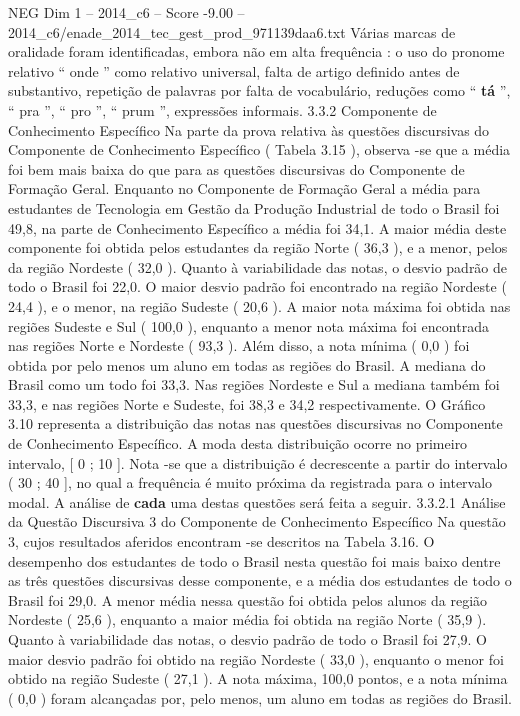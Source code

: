 \begin{textsample}{NEG Dim 1 – 2014\_c6 – Score -9.00 – 2014\_c6/enade\_2014\_tec\_gest\_prod\_971139daa6.txt}
Várias marcas de oralidade foram identificadas, embora não em alta frequência : o uso do pronome relativo “ onde ” como relativo universal, falta de artigo definido antes de substantivo, repetição de palavras por falta de vocabulário, reduções como “ \textbf{tá} ”, “ pra ”, “ pro ”, “ prum ”, expressões informais. 3.3.2 Componente de Conhecimento Específico Na parte da prova relativa às questões discursivas do Componente de Conhecimento Específico ( Tabela 3.15 ), observa -se que a média foi bem mais baixa do que para as questões discursivas do Componente de Formação Geral.
Enquanto no Componente de Formação Geral a média para estudantes de Tecnologia em Gestão da Produção Industrial de todo o Brasil foi 49,8, na parte de Conhecimento Específico a média foi 34,1.
A maior média deste componente foi obtida pelos estudantes da região Norte ( 36,3 ), e a menor, pelos da região Nordeste ( 32,0 ).
Quanto à variabilidade das notas, o desvio padrão de todo o Brasil foi 22,0.
O maior desvio padrão foi encontrado na região Nordeste ( 24,4 ), e o menor, na região Sudeste ( 20,6 ).
A maior nota máxima foi obtida nas regiões Sudeste e Sul ( 100,0 ), enquanto a menor nota máxima foi encontrada nas regiões Norte e Nordeste ( 93,3 ).
Além disso, a nota mínima ( 0,0 ) foi obtida por pelo menos um aluno em todas as regiões do Brasil.
A mediana do Brasil como um todo foi 33,3.
Nas regiões Nordeste e Sul a mediana também foi 33,3, e nas regiões Norte e Sudeste, foi 38,3 e 34,2 respectivamente.
O Gráfico 3.10 representa a distribuição das notas nas questões discursivas no Componente de Conhecimento Específico.
A moda desta distribuição ocorre no primeiro intervalo, [ 0 ; 10 ].
Nota -se que a distribuição é decrescente a partir do intervalo ( 30 ; 40 ], no qual a frequência é muito próxima da registrada para o intervalo modal.
A análise de \textbf{cada} uma destas questões será feita a seguir. 3.3.2.1 Análise da Questão Discursiva 3 do Componente de Conhecimento Específico Na questão 3, cujos resultados aferidos encontram -se descritos na Tabela 3.16.
O desempenho dos estudantes de todo o Brasil nesta questão foi mais baixo dentre as três questões discursivas desse componente, e a média dos estudantes de todo o Brasil foi 29,0.
A menor média nessa questão foi obtida pelos alunos da região Nordeste ( 25,6 ), enquanto a maior média foi obtida na região Norte ( 35,9 ).
Quanto à variabilidade das notas, o desvio padrão de todo o Brasil foi 27,9.
O maior desvio padrão foi obtido na região Nordeste ( 33,0 ), enquanto o menor foi obtido na região Sudeste ( 27,1 ).
A nota máxima, 100,0 pontos, e a nota mínima ( 0,0 ) foram alcançadas por, pelo menos, um aluno em todas as regiões do Brasil.

\end{textsample}
